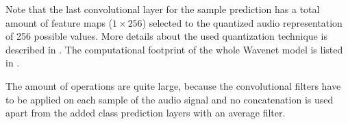 \FloatBarrier
\noindent
Note that the last convolutional layer for the sample prediction has a total amount of feature maps ($1 \times 256$) selected to the quantized audio representation of 256 possible values.
More details about the used quantization technique is described in \cite{Oord2016}.
The computational footprint of the whole Wavenet model is listed in .

The amount of operations are quite large, because the convolutional filters have to be applied on each sample of the audio signal and no concatenation is used apart from the added class prediction layers with an average filter.